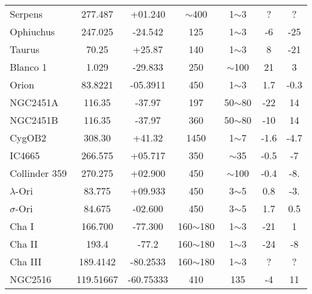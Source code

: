 \begin{table*}
\begin{tabular}{l c c c c c c}
 Serpens   &  277.487    &  +01.240 	 &   $\sim$400    &  1$\sim$3   &  ?    &  ?   \\
 Ophiuchus   &  247.025   &  -24.542 	 &   125    &  1$\sim$3   &  -6    &  -25   \\
 Taurus   &  70.25    &  +25.87 	 &   140    &  1$\sim$3   &  8    &  -21   \\
 Blanco 1   &  1.029    &  -29.833  	 &   250    &  $\sim$100   &  21    &  3   \\
 Orion   &  83.8221     &  -05.3911  	 &   450    &  1$\sim$3   &  1.7    &  -0.3   \\
 NGC2451A   &  116.35       &  -37.97 	 &   197    &  50$\sim$80   &  -22    &  14   \\
 NGC2451B   &  116.35       &  -37.97 	 &   360    &  50$\sim$80   &  -10    &  14   \\
 CygOB2   &  308.30      &  +41.32  	 &   1450    &  1$\sim$7   &  -1.6    &  -4.7   \\
 IC4665   &  266.575     &  +05.717  	 &   350    &  $\sim$35   &  -0.5    &  -7   \\
 Collinder 359   &  270.275      &  +02.900  	 &   450    &  $\sim$100   &  -0.4    &  -8.   \\
 $\lambda$-Ori   &  83.775    &  +09.933  	 &   450    &  3$\sim$5   &  0.8    &  -3.   \\
 $\sigma$-Ori   &  84.675     &  -02.600  	 &   450    &  3$\sim$5   &  1.7    &  0.5   \\
 Cha I   &  166.700       &  -77.300  	 &   160$\sim$180    &  1$\sim$3   &  -21    &  1   \\
 Cha II   &  193.4      &  -77.2   	 &   160$\sim$180    &  1$\sim$3   &  -24    &  -8   \\
 Cha III   &  189.4142     &  -80.2533   	 &   160$\sim$180    &  1$\sim$3   &  ?    &  ?   \\
 NGC2516  &    119.51667  &  -60.75333	 &  410   &  135   &  -4   &  11    \\
\hline
\end{tabular}
\end{table*}

